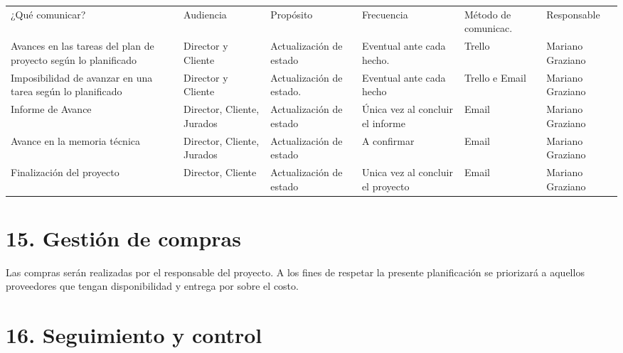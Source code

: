 \documentclass[11pt]{charter}
\begin{document}
\begin{table}[htpb]
\centering
\begin{tabularx}{\linewidth}{@{}|X|C{3cm}|C{3cm}|C{1.8cm}|C{1.5cm}|C{2cm}|@{}}
\hline
{} 
           \\ \hline
{} 
¿Qué comunicar? & Audiencia & Propósito & Frecuencia & Método de comunicac. & Responsable \\ \hline
Avances en las tareas del plan de proyecto según lo planificado             &           Director y Cliente & Actualización de estado &    Eventual ante cada hecho. & Trello                    &     Mariano Graziano        \\ \hline
Imposibilidad de avanzar en una tarea según lo planificado                &           Director y Cliente & Actualización de estado.& Eventual ante cada hecho &            Trello e Email                      &Mariano Graziano             \\ \hline
Informe de Avance               &
Director, Cliente, Jurados & 
Actualización de estado           &    Única vez al concluir el informe& Email                      &     Mariano Graziano        \\ \hline
Avance en la memoria técnica               &
Director, Cliente, Jurados & 
Actualización de estado   &    A confirmar& Email                      &     Mariano Graziano        \\ \hline
Finalización del proyecto               &
Director, Cliente & 
Actualización de estado         &    Unica vez al concluir el proyecto& Email                      &     Mariano Graziano        \\ \hline

                
\end{tabularx}
\end{table}

\section{15. Gestión de compras}
\label{sec:compras}


Las compras serán realizadas por el responsable del proyecto. A los fines de respetar la presente planificación se priorizará a aquellos proveedores que tengan disponibilidad y entrega por sobre el costo. 

\section{16. Seguimiento y control}
\label{sec:seguimiento}
\end{document}
